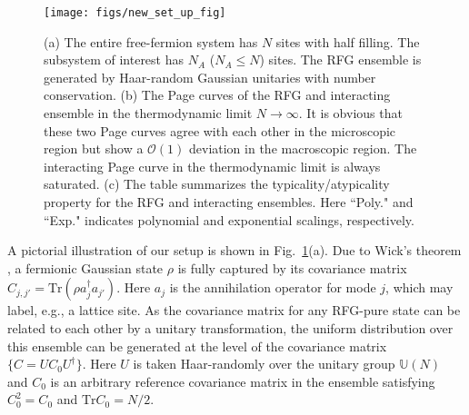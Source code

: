 \documentclass[twocolumn,english,prl,aps,superscriptaddress,amsmath,amssymb,floatfix]{revtex4-2}
\def \Tr {\mathrm{Tr}}
\begin{document}
\begin{figure}
\texttt{[image: figs/new\_set\_up\_fig]}\caption{(a) The entire %
free-fermion system has $N$ sites with half filling. The %
subsystem of interest %
has $N_{A}$ ($N_{A}\le%
N$) sites. %
The RFG ensemble is generated by Haar-random Gaussian unitaries with number conservation. %
(b) %
The Page curves of the RFG %
and interacting ensemble in the thermodynamic limit $N\to\infty$. %
It is obvious that these two Page curves agree with each other in the microscopic region but show a $\mathcal{O}(1)$ deviation in the macroscopic region. The interacting Page curve in the thermodynamic limit is always saturated. (c) The table summarizes the typicality/atypicality property for the RFG and interacting ensembles. Here ``Poly." and ``Exp." indicates polynomial and exponential scalings, respectively.}
\label{Setup_of_CCRFG_ensemble}
\end{figure}

A pictorial illustration of our setup is shown %
in Fig.~\ref{Setup_of_CCRFG_ensemble}(a). 
Due to Wick's theorem \citep{Hackl2021}, a fermionic Gaussian %
state $\rho$ is %
fully captured %
by its covariance matrix $C_{j,j'}=\mathrm{Tr}(\rho a_{j}^{\dagger}a_{j'})$.
Here $a_{j}$ is the annihilation operator for mode $j$, which may label, e.g., a lattice site. %
As the covariance matrix for any RFG-pure state can be related to each
other by a unitary transformation, %
the uniform distribution over this ensemble can be generated at the
level of the covariance matrix $\{C=UC_{0}U^{\dagger}\}$. Here %
$U$ is taken Haar-randomly over the unitary group $\mathbb{U}(N)$ %
\citep{Bianchi2021,Bianchi2021a} and
$C_{0}$ is an arbitrary reference %
covariance matrix in the ensemble satisfying $C_0^2=C_0$ and $\Tr C_0=N/2$. %
\end{document}
